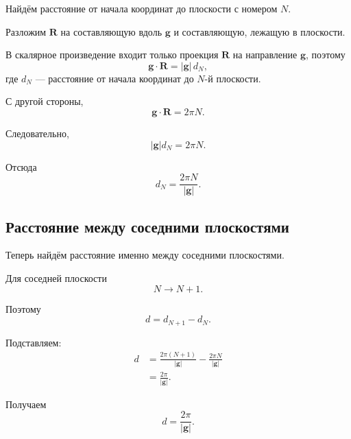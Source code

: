\documentclass[../final.tex]{subfiles}
\begin{document}
Найдём расстояние от начала координат до плоскости
с номером $N$.

Разложим $\mathbf R$ на составляющую вдоль $\mathbf g$
и составляющую, лежащую в плоскости.

В скалярное произведение входит только проекция
$\mathbf R$ на направление $\mathbf g$, поэтому
%
\begin{equation*}
    \mathbf g\cdot\mathbf R
    =
    |\mathbf g|\,d_N,
\end{equation*}
%
где $d_N$ --- расстояние от начала координат
до $N$-й плоскости.

С другой стороны,
%
\begin{equation*}
    \mathbf g\cdot\mathbf R
    =
    2\pi N.
\end{equation*}

Следовательно,
%
\begin{equation*}
    |\mathbf g|d_N
    =
    2\pi N.
\end{equation*}

Отсюда
%
\begin{equation*}
    \boxed{
        d_N
        =
        \frac{2\pi N}{|\mathbf g|}
    }.
\end{equation*}



\subsection*{Расстояние между соседними плоскостями}

Теперь найдём расстояние именно между соседними плоскостями.

Для соседней плоскости
%
\begin{equation*}
    N\longrightarrow N+1.
\end{equation*}

Поэтому
%
\begin{equation*}
    d
    =
    d_{N+1}-d_N.
\end{equation*}

Подставляем:
%
\begin{align*}
    d
    &=
    \frac{2\pi(N+1)}{|\mathbf g|}
    -
    \frac{2\pi N}{|\mathbf g|}
    \\
    &=
    \frac{2\pi}{|\mathbf g|}.
\end{align*}

Получаем
%
\begin{equation*}
    \boxed{
        d
        =
        \frac{2\pi}{|\mathbf g|}
    }.
\end{equation*}
\end{document}
